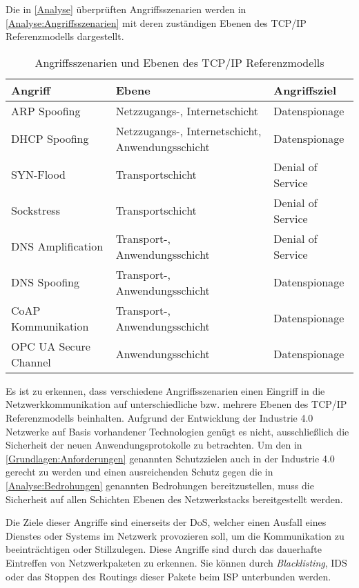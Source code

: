 Die in \autoref{Analyse} überprüften Angriffsszenarien werden in \autoref{Analyse:Angriffsszenarien} mit deren zuständigen Ebenen des \ac{TCP}/\ac{IP} Referenzmodells dargestellt. 

\begin{table}[h]
    \caption{Angriffsszenarien und Ebenen des TCP/IP Referenzmodells}
    \label{Analyse:Angriffsszenarien}
    \renewcommand{\arraystretch}{1.2}
    \centering
    \sffamily
    \begin{footnotesize}
      \begin{tabular}{l l l}
      \toprule
      \textbf{Angriff} & \textbf{Ebene} & \textbf{Angriffsziel}\\
      \midrule
      ARP Spoofing & Netzzugangs-, Internetschicht & Datenspionage\\
      DHCP Spoofing & Netzzugangs-, Internetschicht, Anwendungsschicht & Datenspionage\\
      SYN-Flood & Transportschicht & Denial of Service\\
      Sockstress & Transportschicht & Denial of Service\\
      DNS Amplification & Transport-, Anwendungsschicht & Denial of Service\\
      DNS Spoofing & Transport-, Anwendungsschicht & Datenspionage\\
      CoAP Kommunikation & Transport-, Anwendungsschicht & Datenspionage\\
      OPC UA Secure Channel & Anwendungsschicht & Datenspionage\\
      \bottomrule
      \end{tabular}
    \end{footnotesize}
    \rmfamily
\end{table}

Es ist zu erkennen, dass verschiedene Angriffsszenarien einen Eingriff in die Netzwerkkommunikation auf unterschiedliche bzw. mehrere Ebenen des \ac{TCP}/\ac{IP} Referenzmodells beinhalten. Aufgrund der Entwicklung der Industrie 4.0 Netzwerke auf Basis vorhandener Technologien genügt es nicht, ausschließlich die Sicherheit der neuen Anwendungsprotokolle zu betrachten. Um den in \autoref{Grundlagen:Anforderungen} genannten Schutzzielen auch in der Industrie 4.0 gerecht zu werden und einen ausreichenden Schutz gegen die in \autoref{Analyse:Bedrohungen} genannten Bedrohungen bereitzustellen, muss die Sicherheit auf allen Schichten Ebenen des Netzwerkstacks bereitgestellt werden.

Die Ziele dieser Angriffe sind einerseits der \ac{DoS}, welcher einen Ausfall eines Dienstes oder Systems im Netzwerk provozieren soll, um die Kommunikation zu beeinträchtigen oder Stillzulegen. Diese Angriffe sind durch das dauerhafte Eintreffen von Netzwerkpaketen zu erkennen. Sie können durch \textit{Blacklisting}, \ac{IDS} oder das Stoppen des Routings dieser Pakete beim \ac{ISP} unterbunden werden. 

